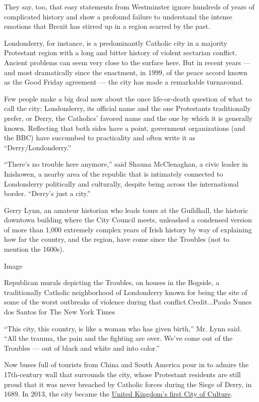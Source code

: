 They say, too, that easy statements from Westminster ignore hundreds of
years of complicated history and show a profound failure to understand
the intense emotions that Brexit has stirred up in a region scarred by
the past.

Londonderry, for instance, is a predominantly Catholic city in a
majority Protestant region with a long and bitter history of violent
sectarian conflict. Ancient problems can seem very close to the surface
here. But in recent years --- and most dramatically since the enactment,
in 1999, of the peace accord known as the Good Friday agreement --- the
city has made a remarkable turnaround.

Few people make a big deal now about the once life-or-death question of
what to call the city: Londonderry, its official name and the one
Protestants traditionally prefer, or Derry, the Catholics' favored name
and the one by which it is generally known. Reflecting that both sides
have a point, government organizations (and the BBC) have succumbed to
practicality and often write it as ``Derry/Londonderry.''

``There's no trouble here anymore,'' said Shauna McClenaghan, a civic
leader in Inishowen, a nearby area of the republic that is intimately
connected to Londonderry politically and culturally, despite being
across the international border. ``Derry's just a city.''

Gerry Lynn, an amateur historian who leads tours at the Guildhall, the
historic downtown building where the City Council meets, unleashed a
condensed version of more than 1,000 extremely complex years of Irish
history by way of explaining how far the country, and the region, have
come since the Troubles (not to mention the 1600s).

Image

Republican murals depicting the Troubles, on houses in the Bogside, a
traditionally Catholic neighborhood of Londonderry known for being the
site of some of the worst outbreaks of violence during that
conflict.Credit...Paulo Nunes dos Santos for The New York Times

``This city, this country, is like a woman who has given birth,'' Mr.
Lynn said. ``All the trauma, the pain and the fighting are over. We've
come out of the Troubles --- out of black and white and into color.''

Now buses full of tourists from China and South America pour in to
admire the 17th-century wall that surrounds the city, whose Protestant
residents are still proud that it was never breached by Catholic forces
during the Siege of Derry, in 1689. In 2013, the city became the
\href{http://www.bbc.com/news/uk-northern-ireland-foyle-west-20849679}{United
Kingdom's first City of Culture}.

